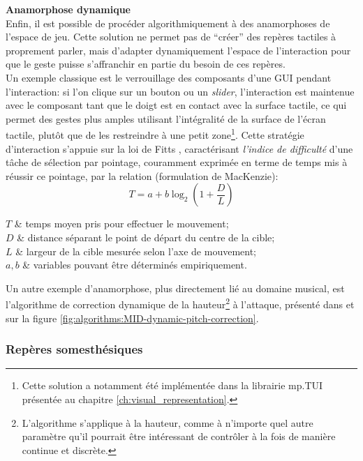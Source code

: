\noindent\textbf{Anamorphose dynamique}\\
\noindent Enfin, il est possible de procéder algorithmiquement à des anamorphoses de l'espace de jeu. Cette solution ne permet pas de ``créer'' des repères tactiles à proprement parler, mais d'adapter dynamiquement l'espace de l'interaction pour que le geste puisse s'affranchir en partie du besoin de ces repères.\\
\indent Un exemple classique est le verrouillage des composants d'une \gls{GUI} pendant l'interaction: si l'on clique sur un bouton ou un \textit{slider}, l'interaction est maintenue avec le composant tant que le doigt est en contact avec la surface tactile, ce qui permet des gestes plus amples utilisant l'intégralité de la surface de l'écran tactile, plutôt que de les restreindre à une petit zone\footnote{Cette solution a notamment été implémentée dans la librairie mp.TUI présentée au chapitre \ref{ch:visual_representation}.}. Cette stratégie d'interaction s'appuie sur la loi de Fitts \cite{fitts_information_1954}, caractérisant \textit{l'indice de difficulté} d'une tâche de sélection par pointage, couramment exprimée en terme de temps mis à réussir ce pointage, par la relation (formulation de MacKenzie): 
$$ T = a + b \log_2 (1 + \frac{D}{L})$$
\vspace{-1em}
\begin{conditions}
$T$     	& temps moyen pris pour effectuer le mouvement; \\
$D$			& distance séparant le point de départ du centre de la cible;\\
$L$			& largeur de la cible mesurée selon l'axe de mouvement;\\
$a, b$  	& variables pouvant être déterminés empiriquement.
\end{conditions}

\noindent Un autre exemple d'anamorphose, plus directement lié au domaine musical, est l'algorithme de correction dynamique de la hauteur\footnote{L'algorithme s'applique à la hauteur, comme à n'importe quel autre paramètre qu'il pourrait être intéressant de contrôler à la fois de manière continue et discrète.} à l'attaque, présenté dans \cite{goudard_playing_2014} et sur la figure \ref{fig:algorithms:MID-dynamic-pitch-correction}.

\subsubsection{Repères somesthésiques}

